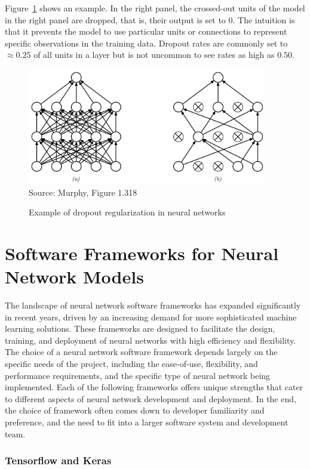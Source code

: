 Figure~\ref{fig:screen7} shows an example. In the right panel, the crossed-out units of the model in the right panel are dropped, that is, their output is set to 0. The intuition is that it prevents the model to use particular units or connections to represent specific observations in the training data. Dropout rates are commonly set to $\approx 0.25$ of all units in a layer but is not uncommon to see rates as high as $0.50$.

\begin{figure}
\centering
\includegraphics[height=2in]{screen7.png} \\

\scriptsize Source: Murphy, Figure 1.318
\caption{Example of dropout regularization in neural networks}
\label{fig:screen7}
\end{figure}

\section{Software Frameworks for Neural Network Models}

The landscape of neural network software frameworks has expanded significantly in recent years, driven by an increasing demand for more sophisticated machine learning solutions. These frameworks are designed to facilitate the design, training, and deployment of neural networks with high efficiency and flexibility. The choice of a neural network software framework depends largely on the specific needs of the project, including the ease-of-use, flexibility, and performance requirements, and the specific type of neural network being implemented. Each of the following frameworks offers unique strengths that cater to different aspects of neural network development and deployment. In the end, the choice of framework often comes down to developer familiarity and preference, and the need to fit into a larger software system and development team.

\subsubsection*{Tensorflow and Keras}

